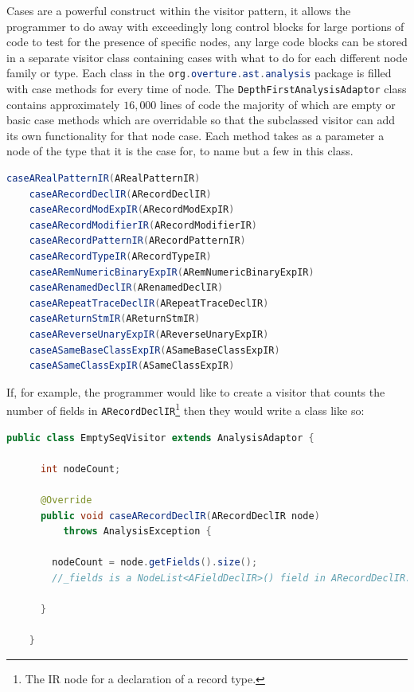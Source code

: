 	Cases are a powerful construct within the visitor pattern, it allows the programmer to do away with exceedingly long control blocks for large portions of code to test for the presence of specific nodes, any large code blocks can be stored in a separate visitor class containing cases with what to do for each different node family or type. Each class in the \lstinline[language=Java]{org.overture.ast.analysis} package is filled with case methods for every time of node. The \lstinline[language=Java]{DepthFirstAnalysisAdaptor} class contains approximately $16,000$ lines of code the majority of which are empty or basic case methods which are overridable so that the subclassed visitor can add its own functionality for that node case. Each method takes as a parameter a node of the type that it is the case for, to name but a few in this class.
	\begin{lstlisting}[language=Java]
	caseARealPatternIR(ARealPatternIR)
	caseARecordDeclIR(ARecordDeclIR)
	caseARecordModExpIR(ARecordModExpIR)
	caseARecordModifierIR(ARecordModifierIR)
	caseARecordPatternIR(ARecordPatternIR)
	caseARecordTypeIR(ARecordTypeIR)
	caseARemNumericBinaryExpIR(ARemNumericBinaryExpIR)
	caseARenamedDeclIR(ARenamedDeclIR)
	caseARepeatTraceDeclIR(ARepeatTraceDeclIR)
	caseAReturnStmIR(AReturnStmIR)
	caseAReverseUnaryExpIR(AReverseUnaryExpIR)
	caseASameBaseClassExpIR(ASameBaseClassExpIR)
	caseASameClassExpIR(ASameClassExpIR)
	\end{lstlisting}
	If, for example, the programmer would like to create a visitor that counts the number of fields in \lstinline[language=Java]{ARecordDeclIR}\footnote{The IR node for a declaration of a record type.} then they would write a class like so:
	\begin{lstlisting}[language=Java]
	public class EmptySeqVisitor extends AnalysisAdaptor {

	  int nodeCount;
	  
	  @Override
	  public void caseARecordDeclIR(ARecordDeclIR node)
	      throws AnalysisException {
	  
	    nodeCount = node.getFields().size();
	    //_fields is a NodeList<AFieldDeclIR>() field in ARecordDeclIR. NodeList is a VDM class in the AST package implementing list functionality.
	    
	  }
	  
	}
	\end{lstlisting}

